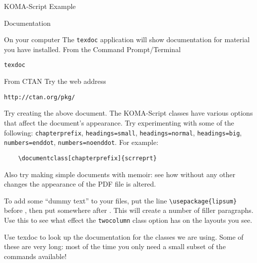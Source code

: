 \begin{frame}[fragile]{KOMA-Script Example}

  

\end{frame}

\begin{frame}{Documentation}

  \begin{block}{On your computer}
    The \texttt{texdoc} application will show documentation for 
    material you have installed. From the Command Prompt/Terminal
    \begin{center}
      \texttt{texdoc }
    \end{center}
  \end{block}
  
  \begin{block}{From CTAN}
    Try the web address
    \begin{center}
      \texttt{http://ctan.org/pkg/}
    \end{center}
  \end{block}

\end{frame}

\begin{exercise}
  Try creating the above document. The KOMA-Script classes have
  various options that affect the document's appearance. Try
  experimenting with some of the following: \texttt{chapterprefix}, 
  \texttt{headings=small}, \texttt{headings=normal},
  \texttt{headings=big}, \texttt{numbers=enddot},
  \texttt{numbers=noenddot}.  For example:
  \begin{verbatim}
    \documentclass[chapterprefix]{scrreprt}
  \end{verbatim}
  
  Also try making simple documents with \textsf{memoir}:
  see how without any other changes the appearance of the PDF
  file is altered.
  
  To add some \enquote{dummy text} to your files, put the line
  \verb"\usepackage{lipsum}" before \verb"", then
  put  somewhere after \verb"". This 
  will create a number of filler paragraphs. Use this to see what effect
  the \texttt{twocolumn} class option has on the layouts you see.
  
  Use \textsf{texdoc} to look up the documentation for the classes
  we are using. Some of these are very long: most of the time you only
  need a small subset of the commands available!
\end{exercise}

